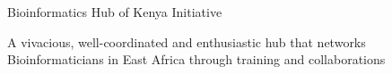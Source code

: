 

\begin{cventries}

   \cventry
   {
    {Bioinformatics Hub of Kenya Initiative} %
     \begin{cvitems} %
        \item {A vivacious, well-coordinated and enthusiastic hub that networks Bioinformaticians in East Africa through training and collaborations}
      \end{cvitems}
    }

\end{cventries}